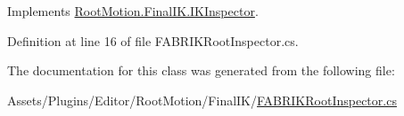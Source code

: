 Implements \mbox{\hyperlink{class_root_motion_1_1_final_i_k_1_1_i_k_inspector_a4c4528d5f5ce9af9e30c049138a5a5ca}{Root\+Motion.\+Final\+I\+K.\+I\+K\+Inspector}}.



Definition at line 16 of file F\+A\+B\+R\+I\+K\+Root\+Inspector.\+cs.



The documentation for this class was generated from the following file\+:\begin{DoxyCompactItemize}
\item 
Assets/\+Plugins/\+Editor/\+Root\+Motion/\+Final\+I\+K/\mbox{\hyperlink{_f_a_b_r_i_k_root_inspector_8cs}{F\+A\+B\+R\+I\+K\+Root\+Inspector.\+cs}}\end{DoxyCompactItemize}

